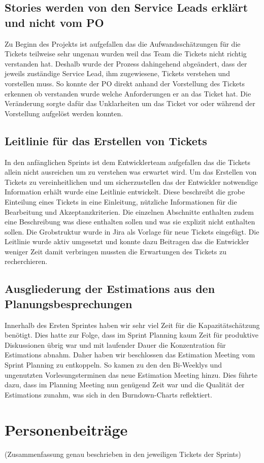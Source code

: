 \subsection{Stories werden von den Service Leads erklärt und nicht vom PO}
Zu Beginn des Projekts ist aufgefallen das die Aufwandsschätzungen für die Tickets 
teilweise sehr ungenau wurden weil das Team die Tickets nicht richtig verstanden hat. 
Deshalb wurde der Prozess dahingehend abgeändert, dass der jeweils zuständige Service 
Lead, ihm zugewiesene, Tickets verstehen und vorstellen muss. So konnte der PO direkt 
anhand der Vorstellung des Tickets erkennen ob verstanden wurde welche Anforderungen 
er an das Ticket hat. Die Veränderung sorgte dafür das Unklarheiten um das Ticket vor
oder während der Vorstellung aufgelöst werden konnten. 

\subsection{Leitlinie für das Erstellen von Tickets}
In den anfänglichen Sprints ist dem Entwicklerteam aufgefallen das die Tickets allein nicht ausreichen 
um zu verstehen was erwartet wird. Um das Erstellen von Tickets zu vereinheitlichen und um sicherzustellen 
das der Entwickler notwendige Information erhält wurde eine Leitlinie entwickelt. 
Diese beschreibt die grobe Einteilung eines Tickets in eine Einleitung, nützliche Informationen für die 
Bearbeitung und Akzeptanzkriterien. Die einzelnen Abschnitte enthalten zudem eine Beschreibung was diese 
enthalten sollen und was sie explizit nicht enthalten sollen. Die Grobstruktur wurde in Jira als Vorlage 
für neue Tickets eingefügt.
Die Leitlinie wurde aktiv umgesetzt und konnte dazu Beitragen das die Entwickler weniger Zeit damit 
verbringen mussten die Erwartungen des Tickets zu recherchieren. 

\subsection{Ausgliederung der Estimations aus den Planungsbesprechungen}

Innerhalb des Ersten Sprintes haben wir sehr viel Zeit für die Kapazitätschätzung benötigt. 
Dies hatte zur Folge, dass im Sprint Planning kaum Zeit für produktive Diskussionen übrig war und mit laufender Dauer die Konzentration für Estimations abnahm.
Daher haben wir beschlossen das Estimation Meeting vom Sprint Planning zu entkoppeln.
So kamen zu den den Bi-Weeklys und ungenutzten Vorlesungsterminen das neue Estimation Meeting hinzu.
Dies führte dazu, dass im Planning Meeting nun genügend Zeit war und die Qualität der Estimations zunahm, was sich in den Burndown-Charts reflektiert.

\section{Personenbeiträge}
(Zusammenfassung genau beschrieben in den jeweiligen Tickets der Sprints)